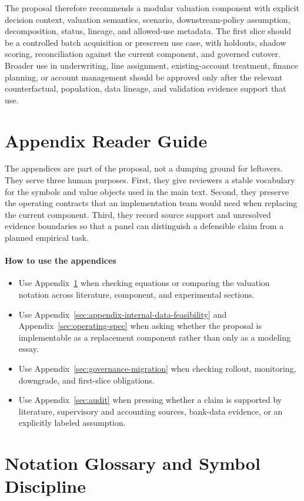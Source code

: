 \documentclass[11pt]{article}
\newcommand{\1}{\mathbf{1}}
\newcommand{\readerbox}[2]{\paragraph{#1}\begin{itemize}[leftmargin=1.5em,itemsep=0.1em,topsep=0.15em]#2\end{itemize}}
\begin{document}
The proposal therefore recommends a modular valuation component with explicit
decision context, valuation semantics, scenario, downstream-policy assumption,
decomposition, status, lineage, and allowed-use metadata. The first slice
should be a controlled batch acquisition or prescreen use case, with holdouts,
shadow scoring, reconciliation against the current component, and governed
cutover. Broader use in underwriting, line assignment, existing-account
treatment, finance planning, or account management should be approved only
after the relevant counterfactual, population, data lineage, and validation
evidence support that use.

\appendix

\section*{Appendix Reader Guide}

The appendices are part of the proposal, not a dumping ground for leftovers.
They serve three human purposes. First, they give reviewers a stable vocabulary
for the symbols and value objects used in the main text. Second, they preserve
the operating contracts that an implementation team would need when replacing
the current component. Third, they record source support and unresolved
evidence boundaries so that a panel can distinguish a defensible claim from a
planned empirical task.

\readerbox{How to use the appendices}{
  \item Use Appendix~\ref{sec:notation-glossary} when checking equations or
        comparing the valuation notation across literature, component, and
        experimental sections.
  \item Use Appendix~\ref{sec:appendix-internal-data-feasibility} and
        Appendix~\ref{sec:operating-spec} when asking whether the proposal is
        implementable as a replacement component rather than only as a modeling
        essay.
  \item Use Appendix~\ref{sec:governance-migration} when checking
        rollout, monitoring, downgrade, and first-slice obligations.
  \item Use Appendix~\ref{sec:audit} when pressing whether a claim is
        supported by literature, supervisory and accounting sources, bank-data
        evidence, or an explicitly labeled assumption.
}

\section{Notation Glossary and Symbol Discipline}
\label{sec:notation-glossary}
\end{document}
